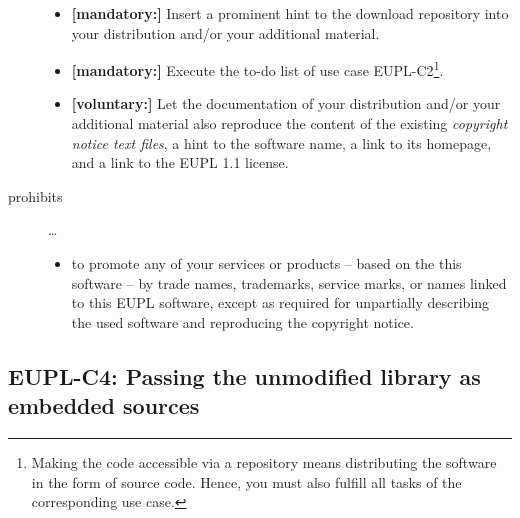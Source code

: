 \begin{description}
\begin{itemize}
 \item \textbf{[mandatory:]} Insert a prominent hint to the download repository
  into your distribution and/or your additional material.
  
  \item \textbf{[mandatory:]} Execute the to-do list of use case EUPL-C2\footnote{
  Making the code accessible via a repository means distributing the software in
  the form of source code. Hence, you must also fulfill all tasks of the
  corresponding use case.}.
 
  \item \textbf{[voluntary:]} Let the documentation of your distribution and/or
  your additional material also reproduce the content of the existing
  \emph{copyright notice text files}, a hint to the software name, a link to its
  homepage, and a link to the EUPL 1.1 license.
\end{itemize}

\item[prohibits] \ldots
\begin{itemize}
  \item to promote any of your services or products -- based on the this software
  -- by trade names, trademarks, service marks, or names linked to this EUPL
  software, except as required for unpartially describing the used software and
  reproducing the copyright notice.
\end{itemize}

\end{description}

\subsection{EUPL-C4: Passing the unmodified library as embedded sources}
\label{OSUC-07S-EUPL}

